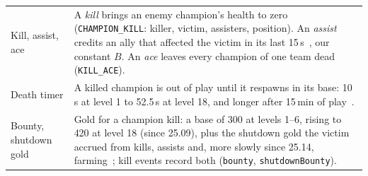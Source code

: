 \begin{table}[!t]
\begin{tabularx}{\textwidth}{@{}>{\raggedright\arraybackslash}p{2.35cm}X@{}}
Kill, assist, ace &
  A \emph{kill} brings an enemy champion's health to zero (\texttt{CHAMPION\_KILL}: killer, victim,
  assisters, position). An \emph{assist} credits an ally that affected the victim in its last
  15\,s~\cite{lolwiki2026kill,lolwiki2026assist}, our constant $B$. An \emph{ace} leaves every champion
  of one team dead~\cite{lolwiki2026terminology} (\texttt{KILL\_ACE}). \\
Death timer &
  A killed champion is out of play until it respawns in its base: 10\,s at level 1 to 52.5\,s at level
  18, and longer after 15\,min of play~\cite{lolwiki2026death}. \\
Bounty, shutdown gold &
  Gold for a champion kill: a base of 300 at levels 1--6, rising to 420 at level 18 (since 25.09), plus the
  shutdown gold the victim accrued from kills, assists and, more slowly since 25.14,
  farming~\cite{lolwiki2026bounties,riot2025patch2509,riot2025patch2514}; kill events record both
  (\texttt{bounty}, \texttt{shutdownBounty}). \\
\midrule

\end{tabularx}
\end{table}
